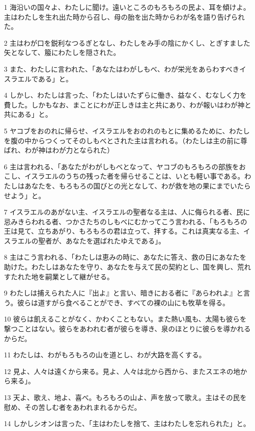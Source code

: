 \par 1 海沿いの国々よ、わたしに聞け。遠いところのもろもろの民よ、耳を傾けよ。主はわたしを生れ出た時から召し、母の胎を出た時からわが名を語り告げられた。
\par 2 主はわが口を鋭利なつるぎとなし、わたしをみ手の陰にかくし、とぎすました矢となして、箙にわたしを隠された。
\par 3 また、わたしに言われた、「あなたはわがしもべ、わが栄光をあらわすべきイスラエルである」と。
\par 4 しかし、わたしは言った、「わたしはいたずらに働き、益なく、むなしく力を費した。しかもなお、まことにわが正しきは主と共にあり、わが報いはわが神と共にある」と。
\par 5 ヤコブをおのれに帰らせ、イスラエルをおのれのもとに集めるために、わたしを腹の中からつくってそのしもべとされた主は言われる。（わたしは主の前に尊ばれ、わが神はわが力となられた）
\par 6 主は言われる、「あなたがわがしもべとなって、ヤコブのもろもろの部族をおこし、イスラエルのうちの残った者を帰らせることは、いとも軽い事である。わたしはあなたを、もろもろの国びとの光となして、わが救を地の果にまでいたらせよう」と。
\par 7 イスラエルのあがない主、イスラエルの聖者なる主は、人に侮られる者、民に忌みきらわれる者、つかさたちのしもべにむかってこう言われる、「もろもろの王は見て、立ちあがり、もろもろの君は立って、拝する。これは真実なる主、イスラエルの聖者が、あなたを選ばれたゆえである」。
\par 8 主はこう言われる、「わたしは恵みの時に、あなたに答え、救の日にあなたを助けた。わたしはあなたを守り、あなたを与えて民の契約とし、国を興し、荒れすたれた地を嗣業として継がせる。
\par 9 わたしは捕えられた人に『出よ』と言い、暗きにおる者に『あらわれよ』と言う。彼らは道すがら食べることができ、すべての裸の山にも牧草を得る。
\par 10 彼らは飢えることがなく、かわくこともない。また熱い風も、太陽も彼らを撃つことはない。彼らをあわれむ者が彼らを導き、泉のほとりに彼らを導かれるからだ。
\par 11 わたしは、わがもろもろの山を道とし、わが大路を高くする。
\par 12 見よ、人々は遠くから来る。見よ、人々は北から西から、またスエネの地から来る」。
\par 13 天よ、歌え、地よ、喜べ。もろもろの山よ、声を放って歌え。主はその民を慰め、その苦しむ者をあわれまれるからだ。
\par 14 しかしシオンは言った、「主はわたしを捨て、主はわたしを忘れられた」と。
